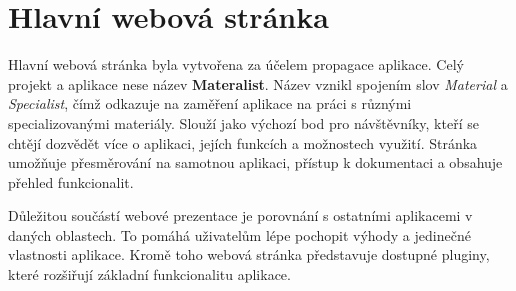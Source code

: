 





\section{Hlavní webová stránka}\label{text:realizace/hlavniStranka}

Hlavní webová stránka byla vytvořena za účelem propagace aplikace.
Celý projekt a aplikace nese název \textbf{Materalist}.
Název vznikl spojením slov \textit{Material} a \textit{Specialist}, čímž odkazuje na zaměření aplikace na práci s různými specializovanými materiály.
Slouží jako výchozí bod pro návštěvníky, kteří se chtějí dozvědět více o aplikaci, jejích funkcích a možnostech využití. 
Stránka umožňuje přesměrování na samotnou aplikaci, přístup k dokumentaci a obsahuje přehled funkcionalit.

Důležitou součástí webové prezentace je porovnání s ostatními aplikacemi v daných oblastech. 
To pomáhá uživatelům lépe pochopit výhody a jedinečné vlastnosti aplikace. 
Kromě toho webová stránka představuje dostupné pluginy, které rozšiřují základní funkcionalitu aplikace.

